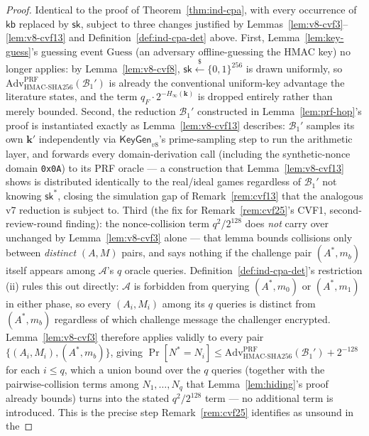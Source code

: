 \documentclass[11pt,a4paper]{article}
\begin{document}
\begin{proof}
Identical to the proof of Theorem~\ref{thm:ind-cpa}, with every occurrence
of $\mathsf{kb}$ replaced by $\mathsf{sk}$, subject to three changes
justified by Lemmas~\ref{lem:v8-cvf3}--\ref{lem:v8-cvf13} and
Definition~\ref{def:ind-cpa-det} above. First,
Lemma~\ref{lem:key-guess}'s guessing event $\mathrm{Guess}$ (an adversary
offline-guessing the HMAC key) no longer applies: by
Lemma~\ref{lem:v8-cvf8}, $\mathsf{sk}\xleftarrow{\$}\{0,1\}^{256}$ is drawn
uniformly, so $\mathrm{Adv}^{\mathrm{PRF}}_{\mathrm{HMAC\text{-}SHA256}}(\mathcal{B}_1')$
is already the conventional uniform-key advantage the literature states,
and the term $q_F\cdot2^{-H_\infty(\mathbf{k})}$ is dropped entirely rather
than merely bounded. Second, the reduction $\mathcal{B}_1'$ constructed in
Lemma~\ref{lem:prf-hop}'s proof is instantiated exactly as
Lemma~\ref{lem:v8-cvf13} describes: $\mathcal{B}_1'$ samples its own
$\mathbf{k}'$ independently via $\mathsf{KeyGen}_{v8}$'s prime-sampling
step to run the arithmetic layer, and forwards every domain-derivation
call (including the synthetic-nonce domain \texttt{0x0A}) to its PRF
oracle --- a construction that Lemma~\ref{lem:v8-cvf13} shows is
distributed identically to the real/ideal games regardless of
$\mathcal{B}_1'$ not knowing $\mathsf{sk}^*$, closing the simulation gap
of Remark~\ref{rem:cvf13} that the analogous v7 reduction is subject to.
Third (the fix for Remark~\ref{rem:cvf25}'s CVF1, second-review-round finding): the
nonce-collision term $q^2/2^{128}$ does \emph{not} carry over unchanged
by Lemma~\ref{lem:v8-cvf3} alone --- that lemma bounds collisions only
between \emph{distinct} $(A,M)$ pairs, and says nothing if the challenge
pair $(A^*,m_b)$ itself appears among $\mathcal{A}$'s $q$ oracle queries.
Definition~\ref{def:ind-cpa-det}'s restriction (ii) rules this out
directly: $\mathcal{A}$ is forbidden from querying $(A^*,m_0)$ or
$(A^*,m_1)$ in either phase, so every $(A_i,M_i)$ among its $q$ queries is
distinct from $(A^*,m_b)$ regardless of which challenge message the
challenger encrypted. Lemma~\ref{lem:v8-cvf3} therefore applies validly to
every pair $\{(A_i,M_i),(A^*,m_b)\}$, giving
$\Pr[N^*=N_i]\leq\mathrm{Adv}^{\mathrm{PRF}}_{\mathrm{HMAC\text{-}SHA256}}(\mathcal{B}_1')+2^{-128}$
for each $i\leq q$, which a union bound over the $q$ queries (together
with the pairwise-collision terms among $N_1,\ldots,N_q$ that
Lemma~\ref{lem:hiding}'s proof already bounds) turns into the stated
$q^2/2^{128}$ term --- no additional term is introduced. This is the
precise step Remark~\ref{rem:cvf25} identifies as unsound in the

\end{proof}
\end{document}
